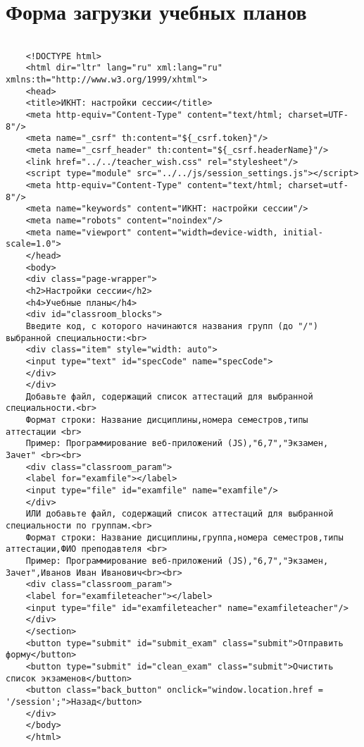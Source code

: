 \chapter{Форма загрузки учебных планов}\label{appendix-exam}	

\begin{lstlisting}
	
	<!DOCTYPE html>
	<html dir="ltr" lang="ru" xml:lang="ru" xmlns:th="http://www.w3.org/1999/xhtml">
	<head>
	<title>ИКНТ: настройки сессии</title>
	<meta http-equiv="Content-Type" content="text/html; charset=UTF-8"/>
	<meta name="_csrf" th:content="${_csrf.token}"/>
	<meta name="_csrf_header" th:content="${_csrf.headerName}"/>
	<link href="../../teacher_wish.css" rel="stylesheet"/>
	<script type="module" src="../../js/session_settings.js"></script>
	<meta http-equiv="Content-Type" content="text/html; charset=utf-8"/>
	<meta name="keywords" content="ИКНТ: настройки сессии"/>
	<meta name="robots" content="noindex"/>
	<meta name="viewport" content="width=device-width, initial-scale=1.0">
	</head>
	<body>
	<div class="page-wrapper">
	<h2>Настройки сессии</h2>
	<h4>Учебные планы</h4>
	<div id="classroom_blocks">
	Введите код, с которого начинаются названия групп (до "/") выбранной специальности:<br>
	<div class="item" style="width: auto">
	<input type="text" id="specCode" name="specCode">
	</div>
	</div>
	Добавьте файл, содержащий список аттестаций для выбранной специальности.<br>
	Формат строки: Название дисциплины,номера семестров,типы аттестации <br>
	Пример: Программирование веб-приложений (JS),"6,7","Экзамен, Зачет" <br><br>
	<div class="classroom_param">
	<label for="examfile"></label>
	<input type="file" id="examfile" name="examfile"/>
	</div>
	ИЛИ добавьте файл, содержащий список аттестаций для выбранной специальности по группам.<br>
	Формат строки: Название дисциплины,группа,номера семестров,типы аттестации,ФИО преподавтеля <br>
	Пример: Программирование веб-приложений (JS),"6,7","Экзамен, Зачет",Иванов Иван Иванович<br><br>
	<div class="classroom_param">
	<label for="examfileteacher"></label>
	<input type="file" id="examfileteacher" name="examfileteacher"/>
	</div>
	</section>
	<button type="submit" id="submit_exam" class="submit">Отправить форму</button>
	<button type="submit" id="clean_exam" class="submit">Очистить список экзаменов</button>
	<button class="back_button" onclick="window.location.href = '/session';">Назад</button>
	</div>
	</body>
	</html>
	
\end{lstlisting}